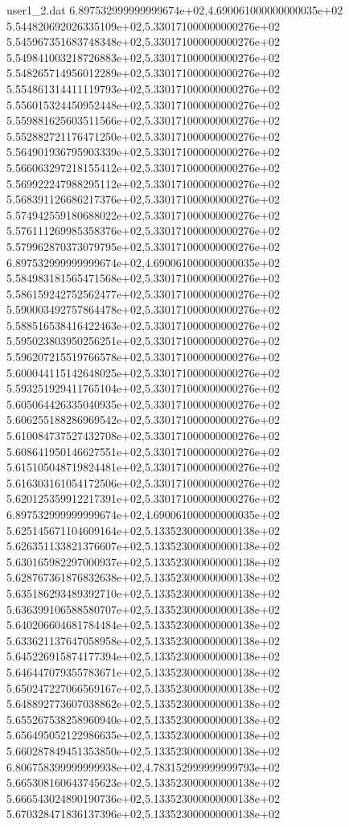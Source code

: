 \begin{filecontents}{user1_2.dat}
6.897532999999999674e+02,4.690061000000000035e+02
5.544820692026335109e+02,5.330171000000000276e+02
5.545967351683748348e+02,5.330171000000000276e+02
5.549841003218726883e+02,5.330171000000000276e+02
5.548265714956012289e+02,5.330171000000000276e+02
5.554861314411119793e+02,5.330171000000000276e+02
5.556015324450952448e+02,5.330171000000000276e+02
5.559881625603511566e+02,5.330171000000000276e+02
5.552882721176471250e+02,5.330171000000000276e+02
5.564901936795903339e+02,5.330171000000000276e+02
5.566063297218155412e+02,5.330171000000000276e+02
5.569922247988295112e+02,5.330171000000000276e+02
5.568391126686217376e+02,5.330171000000000276e+02
5.574942559180688022e+02,5.330171000000000276e+02
5.576111269985358376e+02,5.330171000000000276e+02
5.579962870373079795e+02,5.330171000000000276e+02
6.897532999999999674e+02,4.690061000000000035e+02
5.584983181565471568e+02,5.330171000000000276e+02
5.586159242752562477e+02,5.330171000000000276e+02
5.590003492757864478e+02,5.330171000000000276e+02
5.588516538416422463e+02,5.330171000000000276e+02
5.595023803950256251e+02,5.330171000000000276e+02
5.596207215519766578e+02,5.330171000000000276e+02
5.600044115142648025e+02,5.330171000000000276e+02
5.593251929411765104e+02,5.330171000000000276e+02
5.605064426335040935e+02,5.330171000000000276e+02
5.606255188286969542e+02,5.330171000000000276e+02
5.610084737527432708e+02,5.330171000000000276e+02
5.608641950146627551e+02,5.330171000000000276e+02
5.615105048719824481e+02,5.330171000000000276e+02
5.616303161054172506e+02,5.330171000000000276e+02
5.620125359912217391e+02,5.330171000000000276e+02
6.897532999999999674e+02,4.690061000000000035e+02
5.625145671104609164e+02,5.133523000000000138e+02
5.626351133821376607e+02,5.133523000000000138e+02
5.630165982297000937e+02,5.133523000000000138e+02
5.628767361876832638e+02,5.133523000000000138e+02
5.635186293489392710e+02,5.133523000000000138e+02
5.636399106588580707e+02,5.133523000000000138e+02
5.640206604681784484e+02,5.133523000000000138e+02
5.633621137647058958e+02,5.133523000000000138e+02
5.645226915874177394e+02,5.133523000000000138e+02
5.646447079355783671e+02,5.133523000000000138e+02
5.650247227066569167e+02,5.133523000000000138e+02
5.648892773607038862e+02,5.133523000000000138e+02
5.655267538258960940e+02,5.133523000000000138e+02
5.656495052122986635e+02,5.133523000000000138e+02
5.660287849451353850e+02,5.133523000000000138e+02
6.806758399999999938e+02,4.783152999999999793e+02
5.665308160643745623e+02,5.133523000000000138e+02
5.666543024890190736e+02,5.133523000000000138e+02
5.670328471836137396e+02,5.133523000000000138e+02

\end{filecontents}
